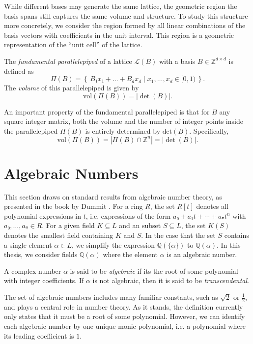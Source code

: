 While different bases may generate the same lattice, the geometric region the
basis spans still captures the same volume and structure.
To study this structure more concretely, we consider the region formed by all
linear combinations of the basis vectors with coefficients in the unit
interval.
This region is a geometric representation of the “unit cell” of the lattice.

\begin{definition}
  The \emph{fundamental parallelepiped} of a lattice $\mathcal{L}(B)$ with a basis $B ∈ ℤ^{d×d}$ is defined as
  \[
    Π(B) = \left\{\, B₁ x₁ + \dots + B_d x_d \mid x_1, \dots, x_d ∈ [0, 1) \,\right\}.
  \]
  The \emph{volume} of this parallelepiped is given by
  \[
    \mathrm{vol}(Π(B)) = |\det(B)|.
  \]
\end{definition}

An important property of the fundamental parallelepiped is that
for $B$ any square integer matrix, both the volume and the number of integer points
inside the parallelepiped $Π(B)$ is entirely determined by $\mathrm{det}(B)$.
Specifically,
\[
  \mathrm{vol}(Π(B)) = |Π(B) ∩ ℤ^n| = |\det(B)|.
\]

\section{Algebraic Numbers}

This section draws on standard results from algebraic number theory, as presented in the book by Dummit \cite{Dummit04}.
For a ring $R$,
the set $R[t]$ denotes all polynomial expressions in $t$,
i.e. expressions of the form $a₀ + a₁ t + ⋯ + aₙ t^n$ with $a₀, …, aₙ ∈ R$.
For a given field $K ⊆ L$ and an subset $S ⊆ L$,
the set $K(S)$ denotes the smallest field containing $K$ and $S$.
In the case that the set $S$ contains a single element $α ∈ L$, we simplify the
expression $ℚ(\{α\})$ to $ℚ(α)$.
In this thesis, we consider fields $ℚ(α)$ where the element $α$ is an algebraic number.

\begin{definition}
  A complex number $α$ is said to be \emph{algebraic} if its the root of some polynomial
  with integer coefficients.
  If $α$ is not algebraic, then it is said to be \emph{transcendental}.
\end{definition}

The set of algebraic numbers includes many familiar constants, such as $\sqrt{2}$ or $\frac{1}{2}$,
and plays a central role in number theory.
As it stands, the definition currently only states that it must be a root of some polynomial.
However, we can identify each algebraic number by one unique monic polynomial,
i.e. a polynomial where its leading coefficient is $1$.

